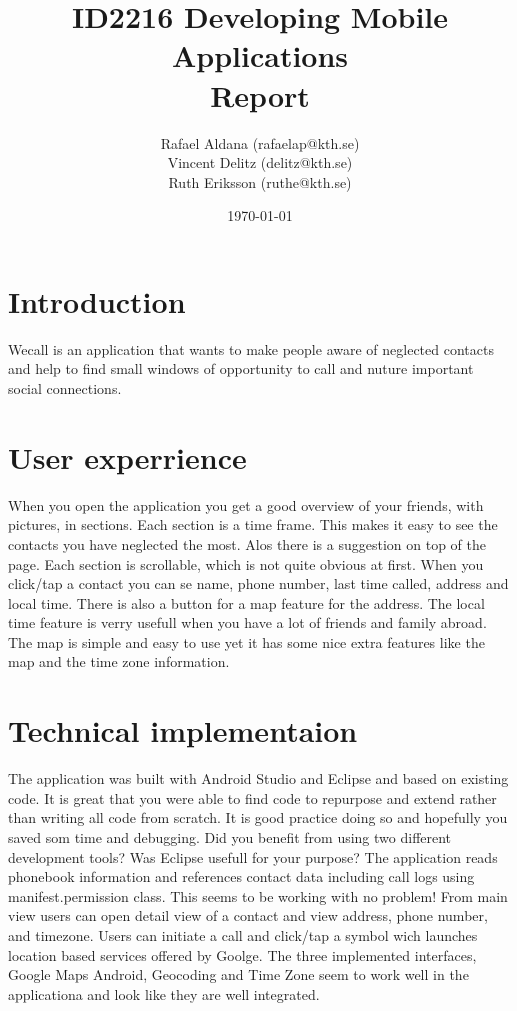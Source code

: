 \documentclass[11pt,twoside,a4paper]{report}
\begin{document}
\title{ID2216 Developing Mobile Applications\\ Report}
\author{Rafael Aldana (rafaelap@kth.se)\\Vincent Delitz (delitz@kth.se)\\Ruth Eriksson (ruthe@kth.se)}
\date{\today}
\maketitle
\section{Introduction}
Wecall is an application that wants to make people aware of neglected contacts and help to find small 
windows of opportunity to call and nuture important social connections.
\section{User experrience}
When you open the application you get a good overview of your friends, with pictures, in sections.
Each section is a time frame. This makes it easy to see the contacts you have neglected the most. Alos there
is a suggestion on top of the page. Each section is scrollable, which is not quite obvious at first. 
When you click/tap a contact you can se name, phone number, last time called, address and local time. 
There is also a button for a map feature for the address. The local time feature is verry usefull when 
you have a lot of friends and family abroad. The map is simple and easy to use yet it has some nice extra 
features like the map and the time zone information.
\section{Technical implementaion}
The application was built with Android Studio and Eclipse and based on existing code. It is great that you 
were able to find code to repurpose and extend rather than writing all code from scratch. It is good practice
doing so and hopefully you saved som time and debugging. 
Did you benefit from using two different development tools? Was Eclipse usefull for your purpose?
The application reads phonebook information and references contact data including call logs using manifest.permission
class. This seems to be working with no problem!
From main view users can open detail view of a contact and view address, phone number, and timezone. Users
can initiate a call and click/tap a symbol wich launches location based services offered by Goolge. The three 
implemented interfaces, Google Maps Android, Geocoding and Time Zone seem to work well in the applicationa and look like they
are well integrated. 
\end{document}
